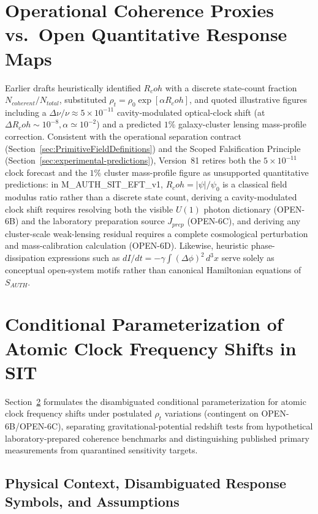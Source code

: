 \documentclass[american,11pt,letterpaper]{article}
\newcommand{\Rcoh}{R_{\mathrm{coh}}}
\def\mathrm#1{#1}%
\def\texttt#1{#1}%
\def\Rcoh{R_coh}%
\begin{document}
\section{Operational Coherence Proxies vs.\ Open Quantitative Response Maps}
\label{sec:quantitative}

Earlier drafts heuristically identified $\Rcoh$ with a discrete state-count fraction $N_{\mathrm{coherent}}/N_{\mathrm{total}}$, substituted $\rho_t = \rho_0\exp[\alpha\Rcoh]$, and quoted illustrative figures including a $\Delta\nu/\nu \approx 5\times 10^{-11}$ cavity-modulated optical-clock shift (at $\Delta\Rcoh \sim 10^{-8}, \alpha \simeq 10^{-2}$) and a predicted $1\%$ galaxy-cluster lensing mass-profile correction. Consistent with the operational separation contract (Section~\ref{sec:PrimitiveFieldDefinitions}) and the Scoped Falsification Principle (Section~\ref{sec:experimental-predictions}), Version~81 retires both the $5\times 10^{-11}$ clock forecast and the $1\%$ cluster mass-profile figure as unsupported quantitative predictions: in \texttt{M\_AUTH\_SIT\_EFT\_v1}, $\Rcoh = |\psi|/\psi_0$ is a classical field modulus ratio rather than a discrete state count, deriving a cavity-modulated clock shift requires resolving both the visible $U(1)$ photon dictionary (\texttt{OPEN-6B}) and the laboratory preparation source $J_{\mathrm{prep}}$ (\texttt{OPEN-6C}), and deriving any cluster-scale weak-lensing residual requires a complete cosmological perturbation and mass-calibration calculation (\texttt{OPEN-6D}). Likewise, heuristic phase-dissipation expressions such as $dI/dt = -\gamma\int (\Delta\phi)^2\,d^3x$ serve solely as conceptual open-system motifs rather than canonical Hamiltonian equations of $S_{\mathrm{AUTH}}$.

\section{Conditional Parameterization of Atomic Clock Frequency Shifts in SIT}
\label{sec:atomic-clock-prediction}
\label{sec:atomic-clocks}

Section~\ref{sec:atomic-clock-prediction} formulates the disambiguated conditional parameterization for atomic clock frequency shifts under postulated $\rho_t$ variations (contingent on \texttt{OPEN-6B}/\texttt{OPEN-6C}), separating gravitational-potential redshift tests from hypothetical laboratory-prepared coherence benchmarks and distinguishing published primary measurements from quarantined sensitivity targets.

\subsection{Physical Context, Disambiguated Response Symbols, and Assumptions} %
\end{document}
